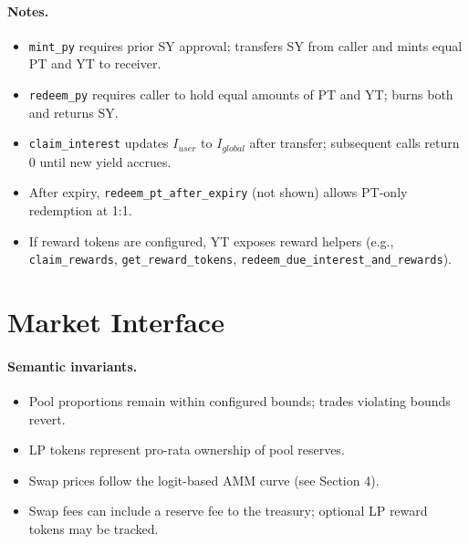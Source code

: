 \paragraph{Notes.}
\begin{itemize}
\item \texttt{mint\_py} requires prior SY approval; transfers SY from caller and mints equal PT and YT to receiver.
\item \texttt{redeem\_py} requires caller to hold equal amounts of PT and YT; burns both and returns SY.
\item \texttt{claim\_interest} updates $I_{user}$ to $I_{global}$ after transfer; subsequent calls return 0 until new yield accrues.
\item After expiry, \texttt{redeem\_pt\_after\_expiry} (not shown) allows PT-only redemption at 1:1.
\item If reward tokens are configured, YT exposes reward helpers (e.g., \texttt{claim\_rewards}, \texttt{get\_reward\_tokens}, \texttt{redeem\_due\_interest\_and\_rewards}).
\end{itemize}


\section{Market Interface}

\paragraph{Semantic invariants.}
\begin{itemize}
\item Pool proportions remain within configured bounds; trades violating bounds revert.
\item LP tokens represent pro-rata ownership of pool reserves.
\item Swap prices follow the logit-based AMM curve (see Section 4).
\item Swap fees can include a reserve fee to the treasury; optional LP reward tokens may be tracked.
\end{itemize}

